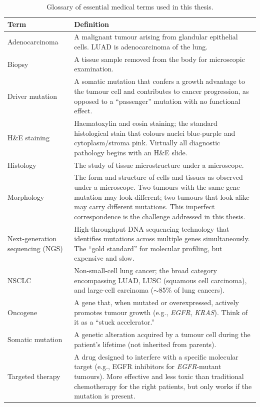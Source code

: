 \begin{table}[ht!]
\centering
\small
\caption{Glossary of essential medical terms used in this thesis.}
\label{tab:glossary}
\begin{tabular}{p{3.8cm} p{9.2cm}}
\hline
\textbf{Term} & \textbf{Definition} \\
\hline
Adenocarcinoma & A malignant tumour arising from glandular epithelial cells. LUAD is adenocarcinoma of the lung. \\
Biopsy & A tissue sample removed from the body for microscopic examination. \\
Driver mutation & A somatic mutation that confers a growth advantage to the tumour cell and contributes to cancer progression, as opposed to a ``passenger'' mutation with no functional effect. \\
H\&E staining & Haematoxylin and eosin staining; the standard histological stain that colours nuclei blue-purple and cytoplasm/stroma pink. Virtually all diagnostic pathology begins with an H\&E slide. \\
Histology & The study of tissue microstructure under a microscope. \\
Morphology & The form and structure of cells and tissues as observed under a microscope. Two tumours with the same gene mutation may look different; two tumours that look alike may carry different mutations. This imperfect correspondence is the challenge addressed in this thesis. \\
Next-generation sequencing (NGS) & High-throughput DNA sequencing technology that identifies mutations across multiple genes simultaneously. The ``gold standard'' for molecular profiling, but expensive and slow. \\
NSCLC & Non-small-cell lung cancer; the broad category encompassing LUAD, LUSC (squamous cell carcinoma), and large-cell carcinoma ($\sim$85\% of lung cancers). \\
Oncogene & A gene that, when mutated or overexpressed, actively promotes tumour growth (e.g., \textit{EGFR}, \textit{KRAS}). Think of it as a ``stuck accelerator.'' \\
Somatic mutation & A genetic alteration acquired by a tumour cell during the patient's lifetime (not inherited from parents). \\
Targeted therapy & A drug designed to interfere with a specific molecular target (e.g., EGFR inhibitors for \textit{EGFR}-mutant tumours). More effective and less toxic than traditional chemotherapy for the right patients, but only works if the mutation is present. \\

\end{tabular}
\end{table}
